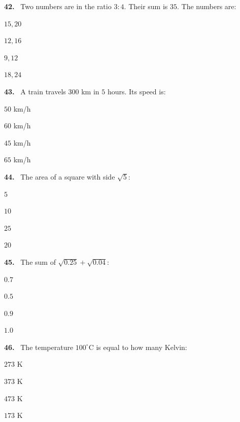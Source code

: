 \documentclass[11pt]{article}
\newenvironment{qenv}[1]{%
  \par\medskip\noindent\textbf{#1.}\ \ignorespaces
}{\par}
\begin{document}
\begin{qenv}{42} Two numbers are in the ratio $3:4$. Their sum is $35$. The numbers are:
\begin{options} \item $15, 20$ \item $12, 16$ \item $9, 12$ \item $18, 24$ \end{options} \end{qenv}

\begin{qenv}{43} A train travels $300$ km in $5$ hours. Its speed is:
\begin{options} \item $50$ km/h \item $60$ km/h \item $45$ km/h \item $65$ km/h \end{options} \end{qenv}

\begin{qenv}{44} The area of a square with side $\sqrt{5}$:
\begin{options} \item $5$ \item $10$ \item $25$ \item $20$ \end{options} \end{qenv}

\begin{qenv}{45} The sum of $\sqrt{0.25}+\sqrt{0.04}$:
\begin{options} \item $0.7$ \item $0.5$ \item $0.9$ \item $1.0$ \end{options} \end{qenv}

\begin{qenv}{46} The temperature $100^{\circ}$C is equal to how many Kelvin:
\begin{options} \item $273$ K \item $373$ K \item $473$ K \item $173$ K \end{options} \end{qenv}
\end{document}
